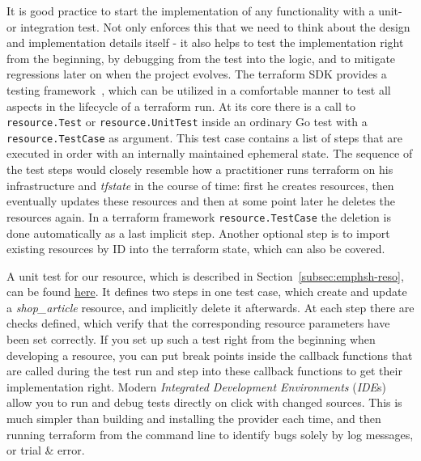 \documentclass[paper=a4,11pt,numbers=noenddot]{article}
\begin{document}
It is good practice to start the implementation of any functionality with a unit- or integration test. Not only enforces this that we need to think about the design and implementation details itself - it also helps to test the implementation right from the beginning, by debugging from the test into the logic, and to mitigate regressions later on when the project evolves. The terraform SDK provides a testing framework~\autocite{noauthor_terraform_acceptance_testing_nodate}, which can be utilized in a comfortable manner to test all aspects in the lifecycle of a terraform run. At its core there is a call to \verb'resource.Test' or \verb'resource.UnitTest' inside an ordinary Go test with a \verb'resource.TestCase' as argument. This test case contains a list of steps that are executed in order with an internally maintained ephemeral state. The sequence of the test steps would closely resemble how a practitioner runs terraform on his infrastructure and \emph{tfstate} in the course of time: first he creates resources, then eventually updates these resources and then at some point later he deletes the resources again. In a terraform framework \verb'resource.TestCase' the deletion is done automatically as a last implicit step. Another optional step is to import existing resources by ID into the terraform state, which can also be covered.

A unit test for our resource, which is described in Section~\ref{subsec:emphsh-reso}, can be found \href{https://github.com/ecky-l/terraform-provider-example/blob/main/src/tfp-example/example/shop_article_resource_test.go}{here}. It defines two steps in one test case, which create and update a \emph{shop\_article} resource, and implicitly delete it afterwards. At each step there are checks defined, which verify that the corresponding resource parameters have been set correctly. If you set up such a test right from the beginning when developing a resource, you can put break points inside the callback functions that are called during the test run and step into these callback functions to get their implementation right. Modern \emph{Integrated Development Environments} (\emph{IDE}s) allow you to run and debug tests directly on click with changed sources. This is much simpler than building and installing the provider each time, and then running terraform from the command line to identify bugs solely by log messages, or trial \& error.
\end{document}
